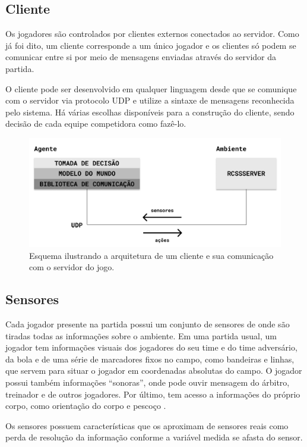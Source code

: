 \subsection{Cliente}
\par Os jogadores são controlados por clientes externos conectados ao servidor. Como já foi dito, um cliente corresponde a um único jogador e os clientes só podem se comunicar entre si por meio de mensagens enviadas através do servidor da partida.
\par O cliente pode ser desenvolvido em qualquer linguagem desde que se comunique com o servidor via protocolo UDP e utilize a sintaxe de mensagens reconhecida pelo sistema. Há várias escolhas disponíveis para a construção do cliente, sendo decisão de cada equipe competidora como fazê-lo.

\begin{figure}[H]
	\includegraphics[width=0.9\linewidth]{figs/system.png}
	\centering
	\caption{Esquema ilustrando a arquitetura de um cliente e sua comunicação com o servidor do jogo.}
	\label{fig:system}
\end{figure}

\subsection{Sensores}
\par Cada jogador presente na partida possui um conjunto de sensores de onde são tiradas todas as informações sobre o ambiente. Em uma partida usual, um jogador tem informações visuais dos jogadores do seu time e do time adversário, da bola e de uma série de marcadores fixos no campo, como bandeiras e linhas, que servem para situar o jogador em coordenadas absolutas do campo. O jogador possui também informações ``sonoras'', onde pode ouvir mensagem do árbitro, treinador e de outros jogadores. Por último, tem acesso a informações do próprio corpo, como orientação do corpo e pescoço \cite{rcssmanual2003}.
\par Os sensores possuem características que os aproximam de sensores reais como perda de resolução da informação conforme a variável medida se afasta do sensor.


